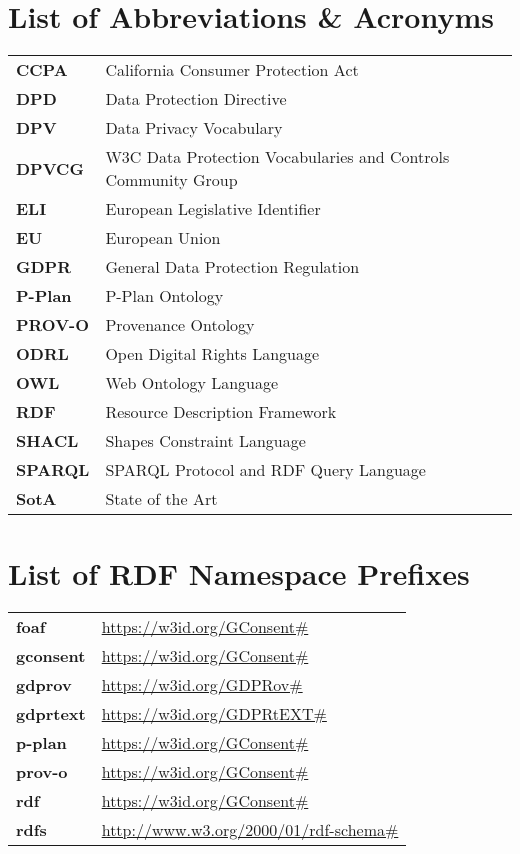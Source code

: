 \thispagestyle{empty}
\section*{List of Abbreviations \& Acronyms}
\begin{table}[htbp]
    \begin{tabular}{>{\bfseries}l|l}
        CCPA & California Consumer Protection Act \\
        DPD & Data Protection Directive \\
        DPV & Data Privacy Vocabulary \\
        DPVCG & W3C Data Protection Vocabularies and Controls Community Group \\
        ELI & European Legislative Identifier \\
        EU & European Union \\
        GDPR & General Data Protection Regulation \\
        P-Plan & P-Plan Ontology \\
        PROV-O & Provenance Ontology \\
        ODRL & Open Digital Rights Language \\ 
        OWL & Web Ontology Language \\
        RDF & Resource Description Framework \\
        SHACL & Shapes Constraint Language \\
        SPARQL & SPARQL Protocol and RDF Query Language \\
        SotA & State of the Art \\
    \end{tabular}
\end{table}

\section*{List of RDF Namespace Prefixes}
\begin{table}[htbp]
    \begin{tabular}{>{\bfseries}l|l}
        foaf      & \url{https://w3id.org/GConsent#} \\
        gconsent  & \url{https://w3id.org/GConsent#} \\
        gdprov    & \url{https://w3id.org/GDPRov#} \\
        gdprtext  & \url{https://w3id.org/GDPRtEXT#} \\
        p-plan    & \url{https://w3id.org/GConsent#} \\
        prov-o    & \url{https://w3id.org/GConsent#} \\
        rdf       & \url{https://w3id.org/GConsent#} \\
        rdfs      & \url{http://www.w3.org/2000/01/rdf-schema#} \\
    \end{tabular}
\end{table}
